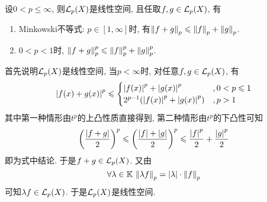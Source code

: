 \begin{Theorem}
	设$ 0<p\leqslant\infty $, 则$ \mathcal{L}_p(X) $是线性空间, 且任取$ f, g\in\mathcal{L}_p(X) $, 有
	\begin{enumerate}[(1)]
		\item Minkowski不等式: $ p\in[1,\infty] $时, 有$ \left\| f+g \right\|_p\leqslant\left\| f \right\|_p+\left\| g \right\|_p $.
		\item $ 0<p<1 $时, $ \left\| f+g \right\|_p^p\leqslant \left\| f \right\|_p^p+\left\| g \right\|_p^p $.
	\end{enumerate}
\end{Theorem}
\begin{Proof}
	首先说明$ \mathcal{L}_p(X) $是线性空间, 当$ p<\infty $时, 对任意$ f, g\in\mathcal{L}_p(X) $, 有
	\[
		\left| f(x)+g(x) \right| ^p\leqslant\begin{cases}
			\left| f(x) \right| ^p+\left| g(x) \right| ^p          & ,0<p\leqslant 1 \\
			2^{p-1}(\left| f(x) \right| ^p+\left| g(x) \right| ^p) & ,p>1
		\end{cases}
	\]
	其中第一种情形由$ t^p $的上凸性质直接得到, 第二种情形由$ t^p $的下凸性可知
	\[
		\left(\frac{\left| f+g \right| }{2}\right)^p\leqslant\left(\frac{\left| f \right| +\left| g \right| }{2}\right)^p\leqslant\frac{\left| f \right| ^p}{2}+\frac{\left| g \right| ^p}{2}
	\]
	即为式中结论. 于是$ f+g\in\mathcal{L}_p(X) $. 又由
	\[
		\forall\lambda\in\mathbb{K}\,\left\| \lambda f \right\|_p=\left| \lambda \right| \cdot\left\| f \right\|_p
	\]
	可知$ \lambda f\in\mathcal{L}_p(X) $. 于是$ \mathcal{L}_p(X) $是线性空间.


\end{Proof}
